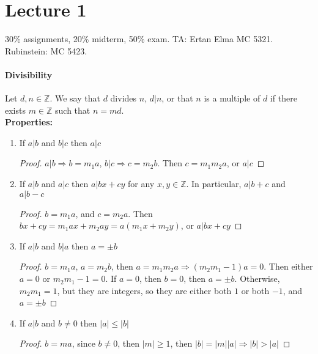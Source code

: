 \documentclass[10pt,letter]{article}
\theoremstyle{plain}
\theoremstyle{definition}
\begin{document}
\section*{Lecture 1}
30\% assignments, 20\% midterm, 50\% exam. TA: Ertan Elma MC 5321. Rubinstein: MC 5423. \\ 

\paragraph{Divisibility}
Let $d,n\in\mathbb{Z}$. We say that $d$ divides $n$, $d|n$, or that $n$ is a multiple of $d$ if there exists $m\in\mathbb{Z}$ such that $n=md$. \\ 
\textbf{Properties:} 
\begin{enumerate}
    \item If $a|b$ and $b|c$ then $a|c$ \begin{proof}$a|b\Rightarrow b=m_1a$, $b|c\Rightarrow c=m_2b$. Then $c=m_1m_2a$, or $a|c$\end{proof}
    \item If $a|b$ and $a|c$ then $a|bx+cy$ for any $x,y\in\mathbb{Z}$. In particular, $a|b+c$ and $a|b-c$ \begin{proof} $b=m_1a$, and $c=m_2a$. Then $bx+cy=m_1ax+m_2ay=a(m_1x+m_2y)$, or $a|bx+cy$ \end{proof}
    \item If $a|b$ and $b|a$ then $a=\pm b$ \begin{proof} $b=m_1a$, $a=m_2b$, then $a=m_1m_2a\Rightarrow (m_2m_1-1)a=0$. Then either $a=0$ or $m_2m_1-1=0$. If $a=0$, then $b=0$, then $a=\pm b$. Otherwise, $m_2m_1=1$, but they are integers, so they are either both $1$ or both $-1$, and $a=\pm b$\end{proof}
    \item If $a|b$ and $b\neq0$ then $|a|\leq|b|$ \begin{proof}$b=ma$, since $b\neq0$, then $|m|\geq1$, then $|b|=|m||a|\Rightarrow |b|>|a|$\end{proof}
\end{enumerate}
\end{document}
